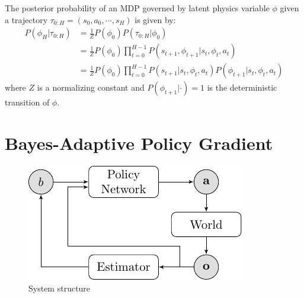 \documentclass{article}
\DeclareMathOperator*{\argmax}{arg\,max}
\begin{document}

The posterior probability of an MDP governed by latent physics variable $\phi$ given a trajectory $\tau_{0:H} = (s_0, a_0, \cdots, s_H)$ is given by:
\begin{align}
P(\phi_H | \tau_{0:H})
  &= \frac{1}{Z} P(\phi_0) P(\tau_{0:H} | \phi_0) \nonumber \\
  &= \frac{1}{Z} P(\phi_0) \prod_{t=0}^{H-1} P(s_{t+1}, \phi_{t+1} | s_t, \phi_t, a_t) \nonumber \\
  &= \frac{1}{Z} P(\phi_0) \prod_{t=0}^{H-1} P(s_{t+1}|s_t, \phi_t, a_t) P(\phi_{t+1} | s_t, \phi_t, a_t)
\end{align}
where $Z$ is a normalizing constant and $P(\phi_{t+1} | \cdot) = 1$ is the deterministic transition of $\phi$.


\section{Bayes-Adaptive Policy Gradient}

\begin{figure}[t!]
\centering
\includegraphics[width=0.5\linewidth]{figs/system_structure.pdf}
\caption{System structure}
\end{figure}
\end{document}

